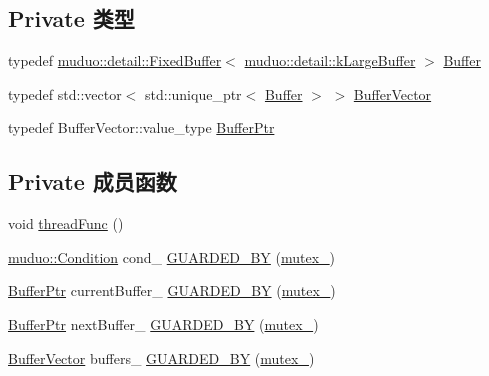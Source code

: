 \subsection*{Private 类型}
\begin{DoxyCompactItemize}
\item 
typedef \hyperlink{classmuduo_1_1detail_1_1FixedBuffer}{muduo\+::detail\+::\+Fixed\+Buffer}$<$ \hyperlink{namespacemuduo_1_1detail_a72d89caa2e467f089bb6cc480d73b884}{muduo\+::detail\+::k\+Large\+Buffer} $>$ \hyperlink{classmuduo_1_1AsyncLogging_a663de001c958343ca7cdf3d35a77159a}{Buffer}
\item 
typedef std\+::vector$<$ std\+::unique\+\_\+ptr$<$ \hyperlink{classmuduo_1_1AsyncLogging_a663de001c958343ca7cdf3d35a77159a}{Buffer} $>$ $>$ \hyperlink{classmuduo_1_1AsyncLogging_ab5cac8d284abaa58e906d90e6dbc11e3}{Buffer\+Vector}
\item 
typedef Buffer\+Vector\+::value\+\_\+type \hyperlink{classmuduo_1_1AsyncLogging_adf677569f52d645909db59d5f982ef6e}{Buffer\+Ptr}
\end{DoxyCompactItemize}
\subsection*{Private 成员函数}
\begin{DoxyCompactItemize}
\item 
void \hyperlink{classmuduo_1_1AsyncLogging_a539feb3c59a20db3b260b312fa7dea34}{thread\+Func} ()
\item 
\hyperlink{classmuduo_1_1Condition}{muduo\+::\+Condition} cond\+\_\+ \hyperlink{classmuduo_1_1AsyncLogging_a7694d2aa52febdbd279ce6207c536326}{G\+U\+A\+R\+D\+E\+D\+\_\+\+BY} (\hyperlink{classmuduo_1_1AsyncLogging_ab9ed43ba5a78211f8947e85d98e1dffb}{mutex\+\_\+})
\item 
\hyperlink{classmuduo_1_1AsyncLogging_adf677569f52d645909db59d5f982ef6e}{Buffer\+Ptr} current\+Buffer\+\_\+ \hyperlink{classmuduo_1_1AsyncLogging_a36269f3557b70644fd592ddf5c1e40ad}{G\+U\+A\+R\+D\+E\+D\+\_\+\+BY} (\hyperlink{classmuduo_1_1AsyncLogging_ab9ed43ba5a78211f8947e85d98e1dffb}{mutex\+\_\+})
\item 
\hyperlink{classmuduo_1_1AsyncLogging_adf677569f52d645909db59d5f982ef6e}{Buffer\+Ptr} next\+Buffer\+\_\+ \hyperlink{classmuduo_1_1AsyncLogging_a1f75ebf898f57f54a653518e4f16de54}{G\+U\+A\+R\+D\+E\+D\+\_\+\+BY} (\hyperlink{classmuduo_1_1AsyncLogging_ab9ed43ba5a78211f8947e85d98e1dffb}{mutex\+\_\+})
\item 
\hyperlink{classmuduo_1_1AsyncLogging_ab5cac8d284abaa58e906d90e6dbc11e3}{Buffer\+Vector} buffers\+\_\+ \hyperlink{classmuduo_1_1AsyncLogging_af92ef4052420619356f3f69e33a852d4}{G\+U\+A\+R\+D\+E\+D\+\_\+\+BY} (\hyperlink{classmuduo_1_1AsyncLogging_ab9ed43ba5a78211f8947e85d98e1dffb}{mutex\+\_\+})
\end{DoxyCompactItemize}
